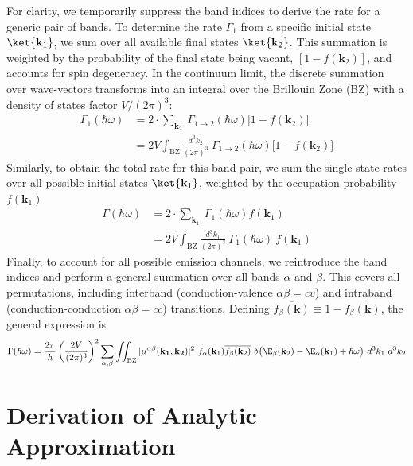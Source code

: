 For clarity, we temporarily suppress the band indices to derive the rate for a generic pair of bands. To determine the rate $\Gamma_{1}$ from a specific initial state $\ket{\mathbf{k}_{1}}$, we sum over all available final states $\ket{\mathbf{k}_{2}}$. This summation is weighted by the probability of the final state being vacant, $[1-f(\mathbf{k}_{2})]$, and accounts for spin degeneracy. In the continuum limit, the discrete summation over wave-vectors transforms into an integral over the Brillouin Zone (BZ) with a density of states factor $V/(2\pi)^{3}$:
\begin{align}
    \Gamma_{1}(\hbar\omega) &= 2 \cdot \sum_{\mathbf{k}_{2}} \ \Gamma_{1\to 2}(\hbar\omega) \Big[1-f(\mathbf{k}_{2})\Big] \\
    &= 2V \int_{\text{BZ}} \frac{d^{3}k_{2}}{(2\pi)^{3}} \ \Gamma_{1\to 2}(\hbar\omega) \Big[1-f(\mathbf{k}_{2})\Big]
\end{align}
Similarly, to obtain the total rate for this band pair, we sum the single-state rates over all possible initial states $\ket{\mathbf{k}_{1}}$, weighted by the occupation probability $f(\mathbf{k}_{1})$
\begin{align}
    \Gamma (\hbar\omega) &= 2\cdot \sum_{\mathbf{k}_{1}} \ \Gamma_{1}(\hbar\omega) f(\mathbf{k}_{1}) \\
    &= 2V \int_{\text{BZ}} \frac{d^{3}k_{1}}{(2\pi)^{3}} \ \Gamma_{1}(\hbar\omega) \ f(\mathbf{k}_{1})
\end{align}
Finally, to account for all possible emission channels, we reintroduce the band indices and perform a general summation over all bands $\alpha$ and $\beta$. This covers all permutations, including interband (conduction-valence $\alpha\beta = cv$) and intraband (conduction-conduction $\alpha\beta =cc$) transitions. Defining $\overline{f_{\beta}(\mathbf{k})} \equiv 1 - f_{\beta}(\mathbf{k})$, the general expression is
\begin{equation}
    \Gamma(\hbar\omega) = \frac{2\pi}{\hbar} \left( \frac{2V}{(2\pi)^{3}} \right)^{2} \sum_{\alpha, \beta} \iint_{\text{BZ}} |\mu^{\alpha\beta}(\mathbf{k_{1}},\mathbf{k_{2}})|^{2} \ f_{\alpha}(\mathbf{k}_{1})\overline{f_{\beta}(\mathbf{k}_{2})} \ \delta\big(\E_{\beta}(\mathbf{k}_{2}) - \E_{\alpha}(\mathbf{k}_{1}) + \hbar\omega \big) \ d^{3}k_{1} \ d^{3}k_{2} \label{eq:general_integral}
\end{equation}

\section{Derivation of Analytic Approximation}
\label{app:analytic}

